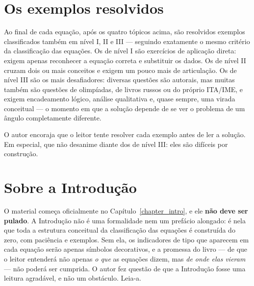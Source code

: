 \section*{Os exemplos resolvidos}

Ao final de cada equação, após os quatro tópicos acima, são resolvidos exemplos
classificados também em nível I, II e III --- seguindo exatamente o mesmo critério
da classificação das equações. Os de nível I são exercícios de aplicação direta: exigem
apenas reconhecer a equação correta e substituir os dados. Os de nível II cruzam dois
ou mais conceitos e exigem um pouco mais de articulação. Os de nível III são os mais
desafiadores: diversas questões são autorais, mas muitas também são questões de olimpíadas, de livros russos ou do próprio
ITA\slash IME, e exigem encadeamento lógico, análise qualitativa e, quase sempre, uma
virada conceitual --- o momento em que a solução depende de se ver o problema de um
ângulo completamente diferente.

O autor encoraja que o leitor tente resolver cada exemplo antes de ler a solução. Em
especial, que não desanime diante dos de nível III: eles são difíceis por construção.


\section*{Sobre a Introdução}

O material começa oficialmente no Capítulo~\ref{chapter_intro}, e ele \textbf{não deve
ser pulado}. A Introdução não é uma formalidade nem um prefácio alongado: é nela que
toda a estrutura conceitual da classificação das equações é construída do zero, com
paciência e exemplos. Sem ela, os indicadores de tipo que aparecem em cada equação
serão apenas símbolos decorativos, e a promessa do livro --- de que o leitor entenderá
não apenas \emph{o que} as equações dizem, mas \emph{de onde elas vieram} --- não
poderá ser cumprida. O autor fez questão de que a Introdução fosse uma leitura
agradável, e não um obstáculo. Leia-a.